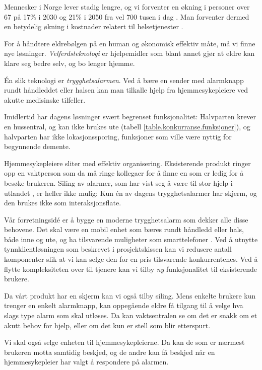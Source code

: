 Mennesker i Norge lever stadig lengre, og vi forventer en økning i personer
over 67 på 17\% i 2030 og 21\% i 2050 fra vel 700 tusen i dag
\cite{org.alarmmottak}. Man forventer dermed en betydelig økning i kostnader
relatert til helsetjenester \cite{lfh.innspill}.

For å håndtere eldrebølgen på en human og økonomisk effektiv måte, må vi finne
nye løsninger. \textit{Velferdsteknologi} er hjelpemidler som blant annet gjør
at eldre kan klare seg bedre selv, og bo lenger hjemme.

Én slik teknologi er \textit{trygghetsalarmen}. Ved å bære en sender med
alarmknapp rundt håndleddet eller halsen kan man tilkalle hjelp fra
hjemmesykepleiere ved akutte medisinske tilfeller.

Imidlertid har dagens løsninger svært begrenset funksjonalitet: Halvparten
krever en hussentral, og kan ikke brukes ute (tabell
\vref{table.konkurranse.funksjoner}), og halvparten har ikke lokasjonssporing,
funksjoner som ville være nyttig for begynnende demente.  

Hjemmesykepleiere sliter med effektiv organisering. Eksisterende produkt ringer
opp en vaktperson som da må ringe kollegaer for å finne en som er ledig for å
besøke brukeren.  Siling av alarmer, som har vist seg å være til stor hjelp i
utlandet \cite{org.alarmmottak}, er heller ikke mulig: Kun én av dagens
trygghetsalarmer har skjerm, og den brukes ikke som interaksjonsflate.

Vår forretningsidé er å bygge en moderne trygghetsalarm som dekker alle disse
behovene. Det skal være en mobil enhet som bæres rundt håndledd eller hals,
både inne og ute, og ha tilsvarende muligheter som smarttelefoner
\cite{alarmparadokset}.  Ved å utnytte tynnklientløsningen som beskrevet i
prosjektskissen kan vi redusere antall komponenter slik at vi kan selge den for
en pris tilsvarende konkurrentenes.  Ved å flytte kompleksiteten over til
tjenere \cite{mobil.virt.fordel} kan vi tilby \textit{ny} funksjonalitet til
eksisterende brukere.

Da vårt produkt har en skjerm kan vi også tilby siling. Mens enkelte brukere
kun trenger en enkelt alarmknapp, kan oppegående eldre få tilgang til å velge
hva slags type alarm som skal utløses. Da kan vaktsentralen se om det er snakk
om et akutt behov for hjelp, eller om det kun er stell som blir etterspurt.

Vi skal også selge enheten til hjemmesykepleierne. Da kan de som er nærmest
brukeren motta samtidig beskjed, og de andre kan få beskjed når en
hjemmesykepleier har valgt å respondere på alarmen.

